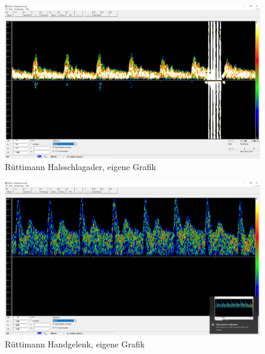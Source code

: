\documentclass[11pt]{scrartcl}
\begin{document}


    \begin{figure}[H]
        \includegraphics[width=15cm]{images/Chris_Hals.png}
        \caption{Rüttimann Halsschlagader, eigene Grafik}
    \end{figure}
    \begin{figure}[H]
        \includegraphics[width=15cm]{images/Chris_Handgelenk.png}
        \caption{Rüttimann Handgelenk, eigene Grafik}
    \end{figure}
\end{document}
